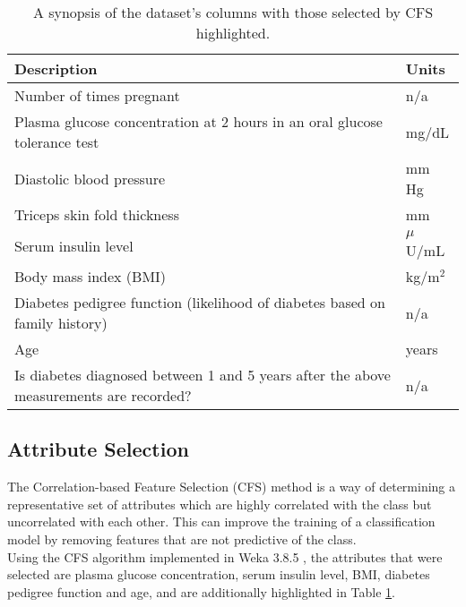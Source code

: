 \begin{table}[h!]
    \caption{A synopsis of the dataset's columns with those selected by CFS highlighted.\label{tab:cols}}
    \begin{center}
        \begin{tabular}{|m{14cm}|l|}
        \hline
        \textbf{Description} & \textbf{Units} \\
        \hline
        Number of times pregnant & n/a\nomenclature{n/a}{Not applicable} \\
        \rowcolor{lightblue}Plasma glucose concentration at 2 hours in an oral glucose tolerance test & mg/dL\nomenclature{mg/dL}{Milligrams per decilitre} \\
        Diastolic blood pressure & mm Hg\nomenclature{mm Hg}{Millimetres of mercury} \\
        Triceps skin fold thickness & mm\nomenclature{mm}{Millimetres} \\
        \rowcolor{lightblue}Serum insulin level & $\mu$U/mL\nomenclature{$\mu$U/mL}{Micro enzyme units per millilitre} \\
        \rowcolor{lightblue}Body mass index (BMI) & kg/m$^2$\nomenclature{kg/m$^2$}{Weight in kilograms per height in metres squared} \\
        \rowcolor{lightblue}Diabetes pedigree function (likelihood of diabetes based on family history) & n/a \\
        \rowcolor{lightblue}Age & years \\
        Is diabetes diagnosed between 1 and 5 years after the above measurements are recorded? & n/a\\
        \hline
    \end{tabular}
    \end{center}

    \subsection{Attribute Selection}
    The Correlation-based Feature Selection (CFS) method is a way of determining a representative set of attributes which are highly correlated with the class but uncorrelated with each other. This can improve the training of a classification model by removing features that are not predictive of the class. \\

    Using the CFS algorithm \cite{cfs} implemented in Weka 3.8.5 \cite{weka}, the attributes that were selected are plasma glucose concentration, serum insulin level, BMI, diabetes pedigree function and age, and are additionally highlighted in Table \ref{tab:cols}.
\end{table}
